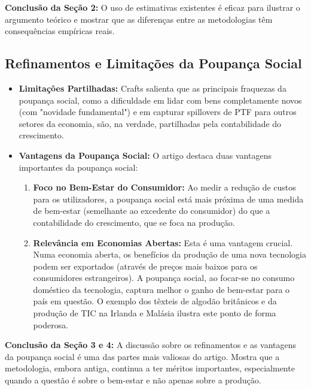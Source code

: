 \documentclass[12pt, a4paper]{article}
\begin{document}
\noindent\textbf{Conclusão da Seção 2:} O uso de estimativas existentes é eficaz para ilustrar o argumento teórico e mostrar que as diferenças entre as metodologias têm consequências empíricas reais.

\subsection{Refinamentos e Limitações da Poupança Social}

\begin{itemize}
    \item \textbf{Limitações Partilhadas:} Crafts salienta que as principais fraquezas da poupança social, como a dificuldade em lidar com bens completamente novos (com "novidade fundamental") e em capturar spillovers de PTF para outros setores da economia, são, na verdade, partilhadas pela contabilidade do crescimento.
    \item \textbf{Vantagens da Poupança Social:} O artigo destaca duas vantagens importantes da poupança social:
        \begin{enumerate}
            \item \textbf{Foco no Bem-Estar do Consumidor:} Ao medir a redução de custos para os utilizadores, a poupança social está mais próxima de uma medida de bem-estar (semelhante ao excedente do consumidor) do que a contabilidade do crescimento, que se foca na produção.
            \item \textbf{Relevância em Economias Abertas:} Esta é uma vantagem crucial. Numa economia aberta, os benefícios da produção de uma nova tecnologia podem ser exportados (através de preços mais baixos para os consumidores estrangeiros). A poupança social, ao focar-se no consumo doméstico da tecnologia, captura melhor o ganho de bem-estar para o país em questão. O exemplo dos têxteis de algodão britânicos e da produção de TIC na Irlanda e Malásia ilustra este ponto de forma poderosa.
        \end{enumerate}
\end{itemize}

\noindent\textbf{Conclusão da Seção 3 e 4:} A discussão sobre os refinamentos e as vantagens da poupança social é uma das partes mais valiosas do artigo. Mostra que a metodologia, embora antiga, continua a ter méritos importantes, especialmente quando a questão é sobre o bem-estar e não apenas sobre a produção.
\end{document}
